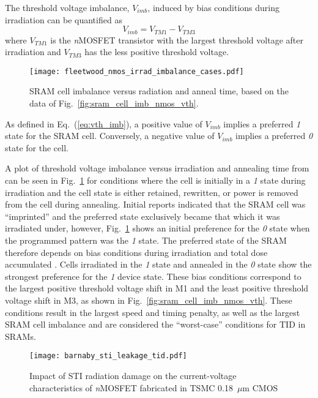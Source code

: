 The threshold voltage imbalance, $V_{imb}$, induced by bias conditions during irradiation can be quantified as
\begin{equation}
    \label{eq:vth_imb}
    V_{imb} = V_{TM1} - V_{TM3}
\end{equation}
where $V_{TM1}$ is the \emph{n}MOSFET transistor with the largest threshold voltage after irradiation and $V_{TM3}$ has the less positive threshold voltage.
\begin{figure}[htbp]
    \begin{center}
        \texttt{[image: fleetwood\_nmos\_irrad\_imbalance\_cases.pdf]}
    \end{center}
    \caption{SRAM cell imbalance versus radiation and anneal time, based on the data of Fig.~\ref{fig:sram_cell_imb_nmos_vth}.}
    \label{fig:sram_cell_imb}
\end{figure}
As defined in Eq.~(\ref{eq:vth_imb}), a positive value of $V_{imb}$ implies a preferred \emph{1} state for the SRAM cell.
Conversely, a negative value of $V_{imb}$ implies a preferred \emph{0} state for the cell.

A plot of threshold voltage imbalance versus irradiation and annealing time from \cite{Fleetwood:1987cfa} can be seen in Fig.~\ref{fig:sram_cell_imb} for conditions where the cell is initially in a \emph{1} state during irradiation and the cell state is either retained, rewritten, or power is removed from the cell during annealing.
Initial reports indicated that the SRAM cell was ``imprinted'' and the preferred state exclusively became that which it was irradiated under, however, Fig.~\ref{fig:sram_cell_imb} shows an initial preference for the \emph{0} state when the programmed pattern was the \emph{1} state. 
The preferred state of the SRAM therefore depends on bias conditions during irradiation and total dose accumulated \cite{Fleetwood:1987cfa}.
Cells irradiated in the \emph{1} state and annealed in the \emph{0} state show the strongest preference for the \emph{1} device state.
These bias conditions correspond to the largest positive threshold voltage shift in M1 and the least positive threshold voltage shift in M3, as shown in Fig.~\ref{fig:sram_cell_imb_nmos_vth}.
These conditions result in the largest speed and timing penalty, as well as the largest SRAM cell imbalance and are considered the ``worst-case'' conditions for TID in SRAMs.

\begin{figure}[htbp]
    \begin{center}
        \texttt{[image: barnaby\_sti\_leakage\_tid.pdf]}
    \end{center}
    \caption[Impact of STI radiation damage on the current-voltage characteristics of \emph{n}MOSFET fabricated in TSMC 0.18~$\mu$m CMOS.]{Impact of STI radiation damage on the current-voltage characteristics of \emph{n}MOSFET fabricated in TSMC 0.18~$\mu$m CMOS \cite{Barnaby:2006cp}}
    \label{fig:tid_sti_leak}
\end{figure}

